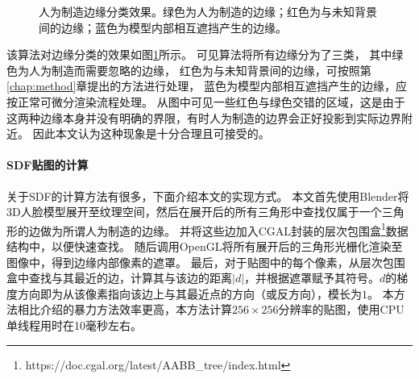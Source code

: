 \begin{figure}
\centering
{}
\caption[人为制造边缘分类效果]{人为制造边缘分类效果。绿色为人为制造的边缘；红色为与未知背景间的边缘；蓝色为模型内部相互遮挡产生的边缘。}
\label{fig:sdf_result}
\end{figure}

该算法对边缘分类的效果如图\ref{fig:sdf_result}所示。
可见算法将所有边缘分为了三类，
其中绿色为人为制造而需要忽略的边缘，
红色为与未知背景间的边缘，可按照第\ref{chap:method}章提出的方法进行处理，
蓝色为模型内部相互遮挡产生的边缘，应按正常可微分渲染流程处理。
从图中可见一些红色与绿色交错的区域，这是由于这两种边缘本身并没有明确的界限，有时人为制造的边界会正好投影到实际边界附近。
因此本文认为这种现象是十分合理且可接受的。

\paragraph{SDF贴图的计算}
关于SDF的计算方法有很多，下面介绍本文的实现方式。
本文首先使用Blender将3D人脸模型展开至纹理空间，然后在展开后的所有三角形中查找仅属于一个三角形的边做为所谓人为制造的边缘。
并将这些边加入CGAL封装的层次包围盒\footnote{https://doc.cgal.org/latest/AABB\_tree/index.html}数据结构中，以便快速查找。
随后调用OpenGL将所有展开后的三角形光栅化渲染至图像中，得到边缘内部像素的遮罩。
最后，对于贴图中的每个像素，从层次包围盒中查找与其最近的边，计算其与该边的距离$|d|$，并根据遮罩赋予其符号。$d$的梯度方向即为从该像素指向该边上与其最近点的方向（或反方向），模长为$1$。
本方法相比\citet{sdf_glyphs}介绍的暴力方法效率更高，本方法计算$256\times256$分辨率的贴图，使用CPU单线程用时在10毫秒左右。

